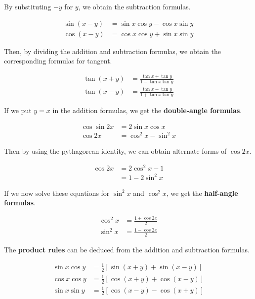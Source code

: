 \documentclass{article}
\begin{document}
By substituting $-y$ for $y$, we obtain the subtraction formulas.

\bgroup
\def\arraystretch{1.5}
\[\boxed{\begin{aligned}
\sin(x-y)&=\sin x\cos y-\cos x\sin y\\
\cos(x-y)&=\cos x\cos y+\sin x\sin y
\end{aligned}}\]
\egroup

Then, by dividing the addition and subtraction formulas, we obtain the corresponding formulas for tangent.

\bgroup
\def\arraystretch{1.5}
\[\boxed{\begin{aligned}
\tan(x+y)&=\frac{\tan x+\tan y}{1-\tan x\tan y}\\
\tan(x-y)&=\frac{\tan x-\tan y}{1+\tan x\tan y}
\end{aligned}}\]
\egroup

If we put $y=x$ in the addition formulas, we get the {\bf{}double-angle formulas}.

\bgroup
\def\arraystretch{1.5}
\[\boxed{\begin{aligned}
\cos\sin2x&=2\sin x\cos x\\
\cos2x&=\cos^2x-\sin^2x
\end{aligned}}\]
\egroup

Then by using the pythagorean identity, we can obtain alternate forms of $\cos2x$.

\bgroup
\def\arraystretch{1.5}
\[\boxed{\begin{aligned}
\cos2x&=2\cos^2x-1\\
&=1-2\sin^2x
\end{aligned}}\]
\egroup

If we now solve these equations for $\sin^2x$ and $\cos^2x$, we get the {\bf{}half-angle formulas}.

\bgroup
\def\arraystretch{1.5}
\[\boxed{\begin{aligned}
\cos^2x&=\frac{1+\cos2x}{2}\\
\sin^2x&=\frac{1-\cos2x}{2}
\end{aligned}}\]
\egroup

The {\bf{}product rules} can be deduced from the addition and subtraction formulas.

\bgroup
\def\arraystretch{1.5}
\[\boxed{\begin{aligned}
\sin x\cos y&=\frac{1}{2}[\sin(x+y)+\sin(x-y)]\\
\cos x\cos y&=\frac{1}{2}[\cos(x+y)+\cos(x-y)]\\
\sin x\sin y&=\frac{1}{2}[\cos(x-y)-\cos(x+y)]
\end{aligned}}\]
\egroup
\end{document}
